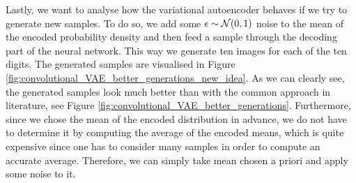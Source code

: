 Lastly, we want to analyse how the variational autoencoder behaves if we try to generate new samples. To do so, we add some $\operatorname{\epsilon}\sim \mathcal{N}(0,1)$ noise to the mean of the encoded probability density and then feed a sample through the decoding part of the neural network. This way we generate ten images for each of the ten digits. The generated samples are visualised in Figure \ref{fig:convolutional_VAE_better_generations_new_idea}. As we can clearly see, the generated samples look much better than with the common approach in literature, see Figure \ref{fig:convolutional_VAE_better_generations}. Furthermore, since we chose the mean of the encoded distribution in advance, we do not have to determine it by computing the average of the encoded means, which is quite expensive since one has to consider many samples in order to compute an accurate average. Therefore, we can simply take mean chosen a priori and apply some noise to it.



